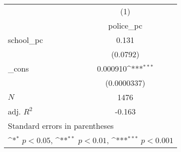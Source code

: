 {
\def\sym#1{\ifmmode^{#1}\else\(^{#1}\)\fi}
\begin{tabular}{l*{1}{c}}
\hline\hline
            &\multicolumn{1}{c}{(1)}\\
            &\multicolumn{1}{c}{police\_pc}\\
\hline
school\_pc   &       0.131         \\
            &    (0.0792)         \\
[1em]
\_cons      &    0.000910\sym{***}\\
            & (0.0000337)         \\
\hline
\(N\)       &        1476         \\
adj. \(R^{2}\)&      -0.163         \\
\hline\hline
\multicolumn{2}{l}{\footnotesize Standard errors in parentheses}\\
\multicolumn{2}{l}{\footnotesize \sym{*} \(p<0.05\), \sym{**} \(p<0.01\), \sym{***} \(p<0.001\)}\\
\end{tabular}
}
